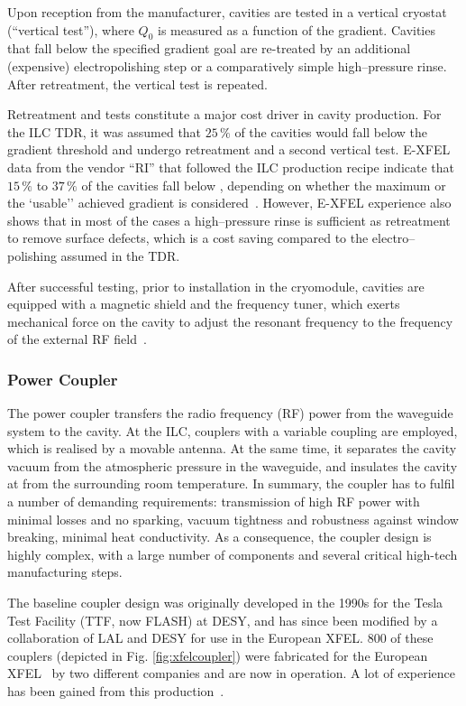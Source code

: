 Upon reception from the manufacturer, cavities are tested in a vertical cryostat (``vertical test''), where $Q_0$ is measured as a function of the gradient.
Cavities that fall below the specified gradient goal are re-treated by an additional (expensive) electropolishing step or a comparatively simple high--pressure rinse. 
After retreatment, the vertical test is repeated.

Retreatment and tests constitute a major cost driver in cavity production. 
For the ILC TDR, it was assumed that $25\,\%$ of the cavities would fall below the  gradient threshold and undergo retreatment and a second vertical test.
E-XFEL data from the vendor ``RI'' that followed the ILC production recipe indicate that $15\,\%$ to $37\,\%$ of the cavities fall below , depending  on whether the maximum or the `usable'' achieved gradient is considered~\cite{bib:Walker:2017.lcws}.
However, E-XFEL experience also shows that in most of the cases a high--pressure rinse is sufficient as retreatment to remove surface defects, which is a cost saving compared to the electro--polishing assumed in the TDR.

After successful testing, prior to installation in the cryomodule, cavities are equipped with a magnetic shield and the frequency tuner, which exerts mechanical force on the cavity to adjust the resonant frequency to the frequency of the external RF field~\cite[Sect. 3.3]{Adolphsen:2013kya}.  


\subsubsection{Power Coupler}

The power coupler transfers the radio frequency (RF) power from the waveguide system to the cavity. 
At the ILC, couplers with a variable coupling are employed, which is realised by a movable antenna.
At the same time, it separates the cavity vacuum from the atmospheric pressure in the waveguide, and insulates the cavity at  from the surrounding room temperature.
In summary, the coupler has to fulfil a number of demanding requirements: transmission of high RF power with minimal losses and no sparking, vacuum tightness and robustness against window breaking, minimal heat conductivity.  
As a consequence, the coupler design is highly complex, with a large number of components and several critical high-tech manufacturing steps.

The baseline coupler design was originally developed in the 1990s for the Tesla Test Facility (TTF, now FLASH) at DESY,
and has since been modified by a collaboration of LAL and DESY for use in the European XFEL.
$800$ of these couplers (depicted in Fig. \ref{fig:xfelcoupler}) were fabricated for the European XFEL~\cite{Kaabi:2013wna} by two different companies and are now in operation.
A lot of experience has been gained from this production~\cite{Sierra:2017wyc}.



